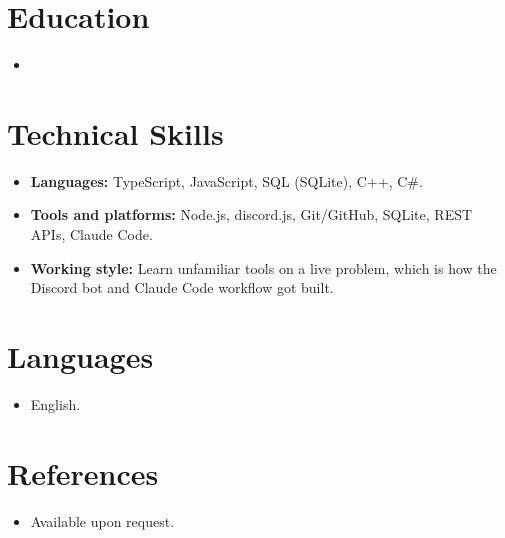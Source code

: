 \documentclass[11pt,a4paper,sans]{moderncv}
\begin{document}

\section{Education}
\vspace{1pt}
\begin{itemize}

\item{}

\end{itemize}


\section{Technical Skills}
\vspace{1pt}
\begin{itemize}
\item \textbf{Languages:} TypeScript, JavaScript, SQL (SQLite), C++, C\#.
\item \textbf{Tools and platforms:} Node.js, discord.js, Git/GitHub, SQLite, REST APIs, Claude Code.
\item \textbf{Working style:} Learn unfamiliar tools on a live problem, which is how the Discord bot and Claude Code workflow got built.
\end{itemize}


\section{Languages}
\vspace{1pt}
\begin{itemize}
\item English.
\end{itemize}


\section{References}
\vspace{1pt}
\begin{itemize}
\item{Available upon request.}
\end{itemize}
\end{document}
